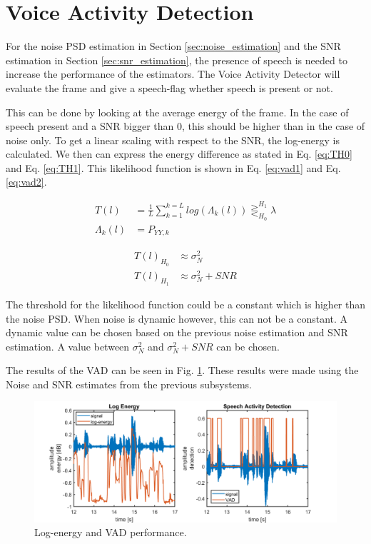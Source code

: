 \section{Voice Activity Detection} \label{sec:vad}
For the noise PSD estimation in Section \ref{sec:noise_estimation} and the SNR estimation in Section \ref{sec:snr_estimation}, the presence of speech is needed to increase the performance of the estimators. The Voice Activity Detector will evaluate the frame and give a speech-flag whether speech is present or not.

This can be done by looking at the average energy of the frame. In the case of speech present and a SNR bigger than 0, this should be higher than in the case of noise only. To get a linear scaling with respect to the SNR, the log-energy is calculated. We then can express the energy difference as stated in Eq. \ref{eq:TH0} and Eq. \ref{eq:TH1}. This likelihood function is shown in Eq. \ref{eq:vad1} and Eq. \ref{eq:vad2}.

\begin{align}
  T(l) &= \frac{1}{L} \sum_{k=1}^{k=L} log(\Lambda_{k}(l)) \gtreqless_{H_{0}}^{H_{1}} \lambda
  \label{eq:vad1}\\
  \Lambda_{k}(l) &= P_{YY,k}
  \label{eq:vad2}
\end{align}

\begin{align}
  T(l)_{H_{0}}  &\approx  \sigma_{N}^{2}
  \label{eq:TH0}\\
  T(l)_{H_{1}}  &\approx  \sigma_{N}^{2} + SNR
  \label{eq:TH1}
\end{align}

The threshold for the likelihood function could be a constant which is higher than the noise PSD. When noise is dynamic however, this can not be a constant. A dynamic value can be chosen based on the previous noise estimation and SNR estimation. A value between $\sigma_{N}^{2}$ and $\sigma_{N}^{2} + SNR$ can be chosen.

The results of the VAD can be seen in Fig. \ref{fig:VAD}. These results were made using the Noise and SNR estimates from the previous subsystems.

\begin{figure}[h]
  \centering
  \includegraphics[width=\textwidth]{images/vad.png}
  \caption{Log-energy and VAD performance.}
  \label{fig:VAD}
\end{figure}

